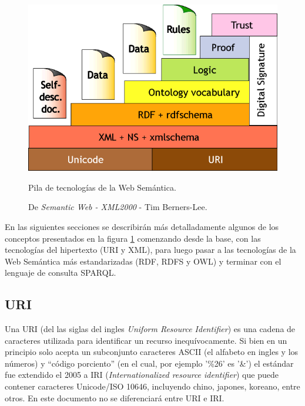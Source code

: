 \begin{figure}[htpb]
  \centering
  \includegraphics[width=.58\textwidth]{figures/Semantic_web_stack.png}
  \caption{Pila de tecnologías de la Web Semántica.}
  \vspace{-.25cm}
  \caption*{De \emph{Semantic Web - XML2000} - Tim
            Berners-Lee\cite{img:swstack}.}
  \label{fig:swstack}
\end{figure}

En las siguientes secciones se describirán más detalladamente algunos de los
conceptos presentados en la figura \ref{fig:swstack} comenzando desde la base,
con las tecnologías del hipertexto (URI y XML), para luego pasar a las
tecnologías de la Web Semántica más estandarizadas (RDF, RDFS y OWL) y terminar
con el lenguaje de consulta SPARQL.

\subsection{URI}
Una URI (del las siglas del ingles \emph{Uniform Resource Identifier}) es una
cadena de caracteres utilizada para identificar un recurso inequívocamente.
Si bien en un principio solo acepta un subconjunto caracteres ASCII (el alfabeto
en ingles y los números) y ``código porciento'' (en el cual, por ejemplo '\%26'
es '\&') el estándar fue extendido el 2005 a IRI (\emph{Internationalized
resource identifier}) que puede contener caracteres Unicode/ISO 10646,
incluyendo chino, japones, koreano, entre otros\cite{gangemi2006bourne}.
En este documento no se diferenciará entre URI e IRI.

